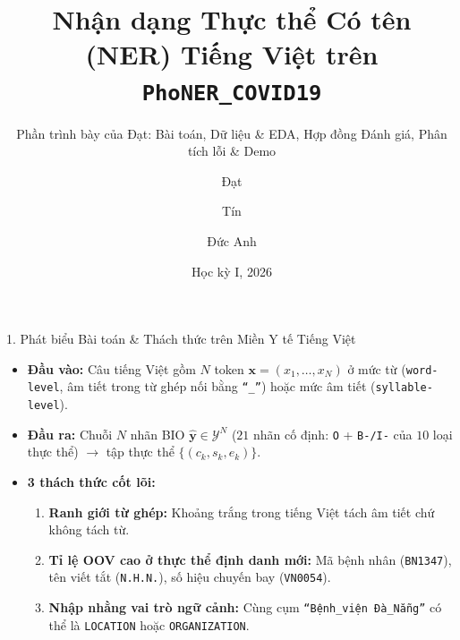 \documentclass[aspectratio=169,10pt]{beamer}
\title[NER Tiếng Việt trên PhoNER\_COVID19]{Nhận dạng Thực thể Có tên (NER) Tiếng Việt trên \texttt{PhoNER\_COVID19}}
\subtitle{Phần trình bày của Đạt: Bài toán, Dữ liệu \& EDA, Hợp đồng Đánh giá, Phân tích lỗi \& Demo}
\author[Đạt, Tín, Đức Anh]{Đạt \and Tín \and Đức Anh}
\institute[UET-VNU]{Khoa Công nghệ Thông tin — Trường Đại học Công nghệ, ĐHQGHN}
\date{Học kỳ I, 2026}
\begin{document}
\begin{frame}
  \titlepage
\end{frame}

\begin{frame}{1. Phát biểu Bài toán \& Thách thức trên Miền Y tế Tiếng Việt}
  \begin{itemize}
    \item \textbf{Đầu vào:} Câu tiếng Việt gồm $N$ token $\mathbf{x} = (x_1, \dots, x_N)$ ở mức từ (\texttt{word-level}, âm tiết trong từ ghép nối bằng \texttt{``\_''}) hoặc mức âm tiết (\texttt{syllable-level}).
    \item \textbf{Đầu ra:} Chuỗi $N$ nhãn BIO $\hat{\mathbf{y}} \in \mathcal{Y}^N$ ($21$ nhãn cố định: \texttt{O} + \texttt{B-/I-} của $10$ loại thực thể) $\rightarrow$ tập thực thể $\{(c_k, s_k, e_k)\}$.
    \item \textbf{3 thách thức cốt lõi:}
      \begin{enumerate}
        \item \textbf{Ranh giới từ ghép:} Khoảng trắng trong tiếng Việt tách âm tiết chứ không tách từ.
        \item \textbf{Tỉ lệ OOV cao ở thực thể định danh mới:} Mã bệnh nhân (\texttt{BN1347}), tên viết tắt (\texttt{N.H.N.}), số hiệu chuyến bay (\texttt{VN0054}).
        \item \textbf{Nhập nhằng vai trò ngữ cảnh:} Cùng cụm \texttt{``Bệnh\_viện Đà\_Nẵng''} có thể là \texttt{LOCATION} hoặc \texttt{ORGANIZATION}.
      \end{enumerate}
  \end{itemize}
\end{frame}
\end{document}
